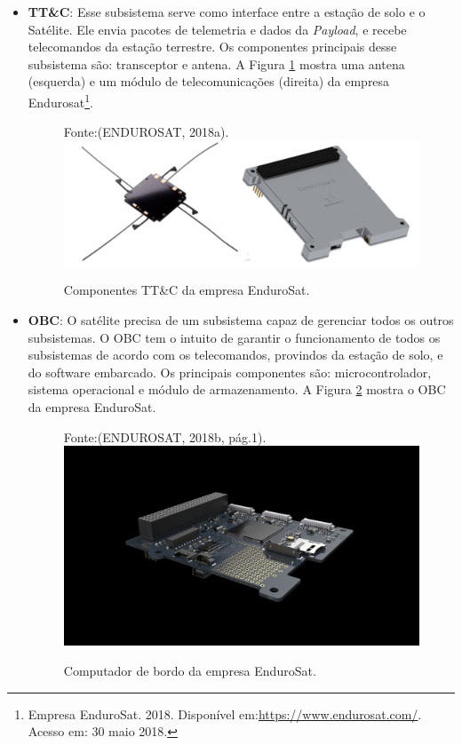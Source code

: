 \begin{itemize}
	\item \textbf{TT\&C}: Esse subsistema serve como interface entre a estação de solo e o Satélite. Ele envia pacotes de telemetria e dados da \textit{Payload}, e recebe telecomandos da estação terrestre. Os componentes principais desse subsistema são: transceptor e antena. A Figura \ref{fig10} mostra uma antena (esquerda) e um módulo de telecomunicações (direita) da empresa Endurosat\footnote{Empresa EnduroSat. 2018. Disponível em:\url{https://www.endurosat.com/}. Acesso em: 30 maio 2018.}.
	
	
	\begin{figure}[h]
		\centering
		Fonte:(ENDUROSAT, 2018a).\linebreak
		\includegraphics[keepaspectratio=true,scale=2.2]{figuras/tt_c.png}
		\caption{Componentes TT\&C da empresa EnduroSat.}
		\label{fig10}
	\end{figure}
	\FloatBarrier
	
	\item \textbf{OBC}: O satélite precisa de um subsistema capaz de gerenciar todos os outros subsistemas. O OBC tem o intuito de garantir o funcionamento de todos os subsistemas de acordo com os telecomandos, provindos da estação de solo, e do software embarcado. Os principais componentes são: microcontrolador, sistema operacional e módulo de armazenamento.  A Figura \ref{fig11} mostra o OBC da empresa EnduroSat.
	
	\begin{figure}[h]
		\centering	
		Fonte:(ENDUROSAT, 2018b, pág.1).
		\includegraphics[keepaspectratio=true,scale=0.2]{figuras/Cubesat-OBC-module-1.jpg}
		\caption{Computador de bordo da empresa EnduroSat.}
		\label{fig11}
	\end{figure}
	\FloatBarrier
\end{itemize}

